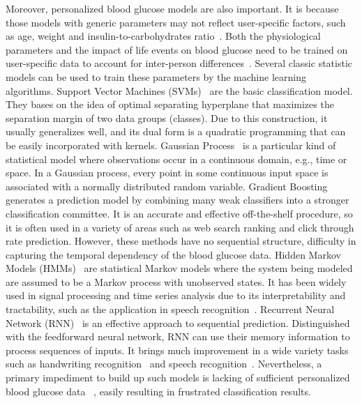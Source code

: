 Moreover, personalized blood glucose models are also important. It is because those models with generic parameters may not reflect user-specific factors, such as age, weight and insulin-to-carbohydrates ratio~\cite{bib:IJNMBE16:Oviedo}.
Both the physiological parameters and the impact of life events on blood glucose need to be trained on user-specific data to account for inter-person differences~\cite{bib:ICMLA13:Bunescu}.  Several classic statistic models can be used to train these parameters by the machine learning algorithms.
\textcolor[rgb]{1.00,0.00,0.00}{Support Vector Machines (SVMs)~\cite{bib:wang2005support} are the basic classification model.  They bases on the idea of optimal separating hyperplane that maximizes the separation margin of two data groups (classes). Due to this construction, it usually generalizes well, and its dual form is a quadratic programming that can be easily incorporated with kernels.
Gaussian Process~\cite{bib:rasmussen2006gaussian} is a particular kind of statistical model where observations occur in a continuous domain, e.g., time or space. In a Gaussian process, every point in some continuous input space is associated with a normally distributed random variable.
Gradient Boosting~\cite{bib:friedman2002stochastic} generates a prediction model by combining many weak classifiers into a stronger classification committee.
It is an accurate and effective off-the-shelf procedure, so it is often used in a variety of areas such as web search ranking and click through rate prediction. However, these methods have no sequential structure, difficulty in capturing the temporal dependency of the blood glucose data.
Hidden Markov Models (HMMs)~\cite{bib:rabiner1986introduction} are statistical Markov models where the system being modeled are assumed to be a Markov process with unobserved states. It has been widely used in signal processing and time series analysis due to its interpretability and tractability, such as the application in speech recognition~\cite{bib:gales2008application}.
Recurrent Neural Network (RNN)~\cite{bib:pearlmutter1989learning} is an effective approach to sequential prediction. Distinguished with the feedforward neural network, RNN can use their memory information to process sequences of inputs. It brings much improvement in a wide variety tasks such as handwriting recognition~\cite{bib:graves2008unconstrained} and speech recognition~\cite{bib:graves2013speech}.}
Nevertheless, a primary impediment to build up such models is lacking of sufficient personalized blood glucose data ~\cite{bib:KDHealth16:Marling}, easily resulting in frustrated classification results.

